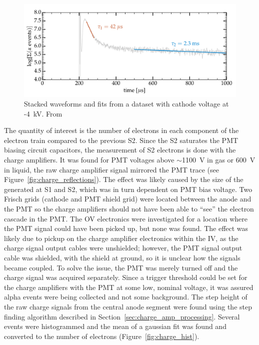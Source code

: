 \begin{figure}[htbp]
\begin{center}
\includegraphics[width=\textwidth]{figures/etrains/etrain_stack.png}
\caption{Stacked waveforms and fits from a dataset with cathode voltage at -4~kV. From \cite{SorensenKamdin2018} }
\label{fig:etrain_stack}
\end{center}
\end{figure}

The quantity of interest is the number of electrons in each component of the electron train compared to the previous S2. Since the S2 saturates the \ac{PMT} biasing circuit capacitors, the measurement of S2 electrons is done with the charge amplifiers. It was found for \ac{PMT} voltages above $\sim$1100~V in gas or 600~V in liquid, the raw charge amplifier signal mirrored the \ac{PMT} trace (see Figure~\ref{fig:charge_reflections}). The effect was likely caused by the size of the generated at S1 and S2, which was in turn dependent on \ac{PMT} bias voltage. Two Frisch grids (cathode and \ac{PMT} shield grid) were located between the anode and the \ac{PMT} so the charge amplifiers should not have been able to ``see'' the electron cascade in the \ac{PMT}. The \ac{OV} electronics were investigated for a location where the \ac{PMT} signal could have been picked up, but none was found. The effect was likely due to pickup on the charge amplifier electronics within the \ac{IV}, as the charge signal output cables were unshielded; however, the \ac{PMT} signal output cable was shielded, with the shield at ground, so it is unclear how the signals became coupled. To solve the issue, the \ac{PMT} was merely turned off and the charge signal was acquired separately. Since a trigger threshold could be set for the charge amplifiers with the \ac{PMT} at some low, nominal voltage, it was assured alpha events were being collected and not some background.  The step height of the raw charge signals from the central anode segment were found using the step finding algorithm described in Section~\ref{sec:charge_amp_processing}. Several events were histogrammed and the mean of a gaussian fit was found and converted to the number of electrons (Figure~\ref{fig:charge_hist}). 

